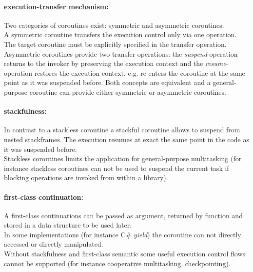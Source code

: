 \paragraph*{execution-transfer mechanism:}
Two categories of coroutines exist: symmetric and asymmetric coroutines.\\
\newline
A symmetric coroutine transfers the execution control only via one operation.
The target coroutine must be explicitly specified in the transfer operation.\\
\newline
Asymmetric coroutines provide two transfer operations:
the \textit{suspend}-operation returns to the invoker by preserving the
execution context  and the \textit{resume}-operation restores the execution
context, e.g. re-enters the coroutine at the same point as it was suspended
before.
Both concepts are equivalent and a general-purpose coroutine can provide either
symmetric or asymmetric coroutines\cite{Moura2009}.

\paragraph*{stackfulness:}
In contrast to a stackless coroutine a stackful coroutine allows to suspend
from nested stackframes. The execution resumes at exact the same point in the
code as it was suspended before.\\
Stackless coroutines limits the application for general-purpose multitasking
\cite{Moura2009} (for instance stackless coroutines can not be used to suspend
the current task if blocking operations are invoked from within a library).

\paragraph*{first-class continuation:}
A first-class continuations can be passed as argument, returned by
function and stored in a data structure to be used later.\\
In some implementations (for instance C\# \textit{yield}) the coroutine can not
directly accessed or directly manipulated.\\
\newline
Without stackfulness and first-class semantic some useful execution control
flows cannot be supported (for instance cooperative multitasking,
checkpointing).

